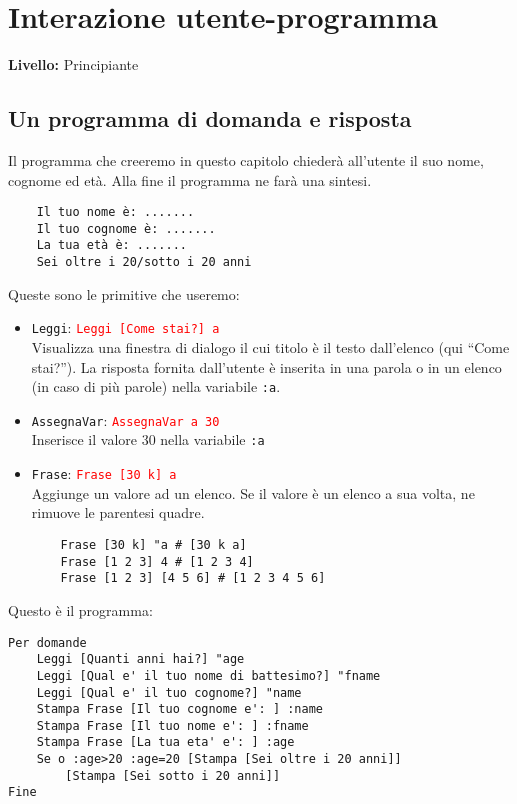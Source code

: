 \chapter{Interazione utente-programma}
{ }\hfill\textbf{Livello:} Principiante\\

\section{Un programma di domanda e risposta}
Il programma che creeremo in questo capitolo chiederà all'utente il suo nome, cognome ed età. Alla fine il programma ne farà una sintesi.
\begin{verbatim}
	Il tuo nome è: .......
	Il tuo cognome è: .......
	La tua età è: .......
	Sei oltre i 20/sotto i 20 anni
\end{verbatim}

Queste sono le primitive che useremo:\\
\begin{itemize}
	\item \texttt{Leggi}:\hspace{4cm}  \textcolor{red}{ \texttt{Leggi [Come stai?] \textquotedbl a}}\\
	Visualizza una finestra di dialogo il cui titolo è il testo dall'elenco (qui ``Come stai?''). La risposta fornita dall'utente è inserita in una parola o in un elenco (in caso di più parole) nella variabile \texttt{:a}.

	\item \texttt{AssegnaVar}:\hspace{4cm}  \textcolor{red}{ \texttt{AssegnaVar \textquotedbl a 30}}\\
	Inserisce il valore 30 nella variabile \texttt{:a}

	\item \texttt{Frase}:\hspace{4cm}  \textcolor{red}{ \texttt{Frase [30 k] \textquotedbl a }}\\
	Aggiunge un valore ad un elenco. Se il valore è un elenco a sua volta, ne rimuove le parentesi quadre.

	\begin{lstlisting}
	Frase [30 k] "a # [30 k a]
	Frase [1 2 3] 4 # [1 2 3 4]
	Frase [1 2 3] [4 5 6] # [1 2 3 4 5 6]
	\end{lstlisting} 

\end{itemize}


Questo è il programma:
\begin{lstlisting}
Per domande
	Leggi [Quanti anni hai?] "age
	Leggi [Qual e' il tuo nome di battesimo?] "fname
	Leggi [Qual e' il tuo cognome?] "name
	Stampa Frase [Il tuo cognome e': ] :name
	Stampa Frase [Il tuo nome e': ] :fname
	Stampa Frase [La tua eta' e': ] :age
	Se o :age>20 :age=20 [Stampa [Sei oltre i 20 anni]] 
		[Stampa [Sei sotto i 20 anni]]
Fine
\end{lstlisting}


